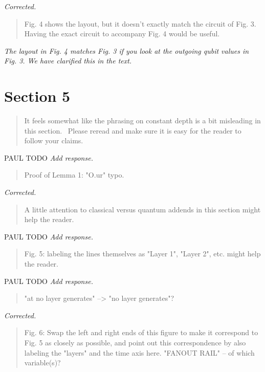 \documentclass{article}
\theoremstyle{plain} \newtheorem{lemma}{Lemma}
\begin{document}
{\it Corrected.}

\begin{quote}
Fig. 4 shows the layout, but it doesn't exactly match the circuit of
Fig. 3.  Having the exact circuit to accompany Fig. 4 would be useful.
\end{quote}

{\it The layout in Fig. 4 matches Fig. 3 if you look at the outgoing qubit values in Fig. 3.  We have clarified this in the text.}

\section{Section 5}

\begin{quote}
It feels somewhat like the phrasing on constant depth is a bit
misleading in this section.  Please reread and make sure it is easy
for the reader to follow your claims.
\end{quote}

PAUL TODO
{\it Add response.}

\begin{quote}
Proof of Lemma 1: "O.ur" typo.
\end{quote}

{\it Corrected.}

\begin{quote}
A little attention to classical versus quantum addends in this section
might help the reader.
\end{quote}

PAUL TODO
{\it Add response.}

\begin{quote}
Fig. 5: labeling the lines themselves as "Layer 1", "Layer 2",
etc. might help the reader.
\end{quote}

PAUL TODO
{\it Add response.}

\begin{quote}
"at no layer generates" --> "no layer generates"?
\end{quote}

{\it Corrected.}

\begin{quote}
Fig. 6: Swap the left and right ends of this figure to make it
correspond to Fig. 5 as closely as possible, and point out this
correspondence by also labeling the "layers" and the time axis here.
"FANOUT RAIL" -- of which variable(s)?
\end{quote}
\end{document}
